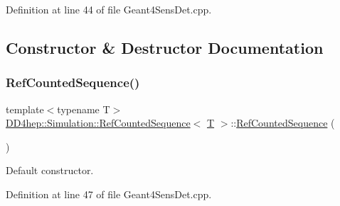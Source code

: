 Definition at line 44 of file Geant4\+Sens\+Det.\+cpp.



\subsection{Constructor \& Destructor Documentation}
\hypertarget{class_d_d4hep_1_1_simulation_1_1_ref_counted_sequence_aff7f878ef368a341330fe3c5a8fd475d}{}\label{class_d_d4hep_1_1_simulation_1_1_ref_counted_sequence_aff7f878ef368a341330fe3c5a8fd475d} 
\subsubsection{\texorpdfstring{Ref\+Counted\+Sequence()}{RefCountedSequence()}\hspace{0.1cm}{\footnotesize\ttfamily [1/2]}}
{\footnotesize\ttfamily template$<$typename T$>$ \\
\hyperlink{class_d_d4hep_1_1_simulation_1_1_ref_counted_sequence}{D\+D4hep\+::\+Simulation\+::\+Ref\+Counted\+Sequence}$<$ \hyperlink{class_t}{T} $>$\+::\hyperlink{class_d_d4hep_1_1_simulation_1_1_ref_counted_sequence}{Ref\+Counted\+Sequence} (\begin{DoxyParamCaption}{ }\end{DoxyParamCaption})\hspace{0.3cm}{\ttfamily [inline]}}



Default constructor. 



Definition at line 47 of file Geant4\+Sens\+Det.\+cpp.

\hypertarget{class_d_d4hep_1_1_simulation_1_1_ref_counted_sequence_ab5c6370432d98faa4b0ba884afa63add}{}\label{class_d_d4hep_1_1_simulation_1_1_ref_counted_sequence_ab5c6370432d98faa4b0ba884afa63add} 
